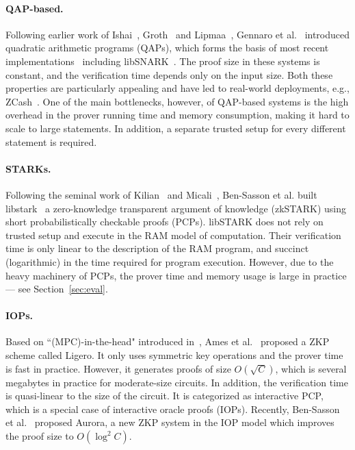 \paragraph{QAP-based.} Following earlier work of Ishai~\cite{IshaiKO07}, Groth~\cite{groth2010short} and Lipmaa~\cite{lipmaa2012progression}, Gennaro et al.~\cite{GGPR13} introduced quadratic arithmetic programs (QAPs), which forms the basis of most recent implementations~\cite{parno2013pinocchio,ben2013snarks,braun13,ben2014scalable,geppetto,wahby2015efficient,Fiore16} including \textsf{libSNARK}~\cite{libsnark}. The proof size in these systems is constant, and the verification time depends only on the input size. Both these properties are particularly appealing and have led to real-world deployments, e.g., ZCash~\cite{zerocash}. One of the main bottlenecks, however, of QAP-based systems  is the high overhead in the prover running time and memory consumption, making it hard to scale to large statements. In addition, a separate trusted setup for every different statement is required. 

\paragraph{STARKs.} Following the seminal work of Kilian~\cite{Kilian92} and Micali~\cite{Micali00}, Ben-Sasson et al. built \textsf{libstark}~\cite{libstark} a zero-knowledge transparent argument of knowledge (zkSTARK) using short probabilistically checkable proofs (PCPs). \textsf{libSTARK} does not rely on trusted setup and execute in the RAM model of computation. Their verification time is only linear to the description of the RAM program, and succinct (logarithmic) in the time required for program execution.  However, due to the heavy machinery of PCPs, the prover time and memory usage is large in practice--- see Section~\ref{sec:eval}. 

\paragraph{IOPs.} Based on ``(MPC)-in-the-head" introduced in~\cite{ishai2007zero,giacomelli2016zkboo,chase2017post}, Ames et al.~\cite{ligero} proposed a ZKP scheme called \textsf{Ligero}. It only uses symmetric key operations and the prover time is fast in practice. However, it generates proofs of size $O(\sqrt{C})$, which is several megabytes in practice for moderate-size circuits. In addition, the verification time is quasi-linear to the size of the circuit. It is categorized as interactive PCP, which is a special case of interactive oracle proofs (IOPs). Recently, Ben-Sasson et al.~\cite{aurora} proposed \textsf{Aurora}, a new ZKP system in the IOP model which improves the proof size to $O(\log^2 C)$.   


